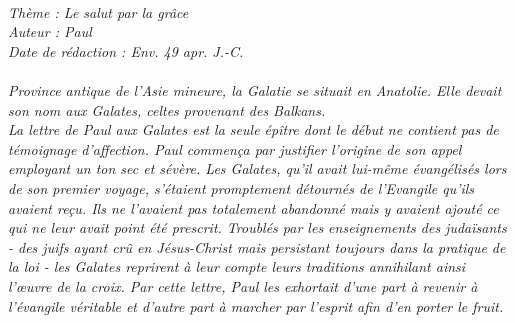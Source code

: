 \BFont
\noindent\hrulefill
\textit{
\bigskip
{\centering{}
\\Thème : Le salut par la grâce
\\Auteur : Paul
\\Date de rédaction : Env. 49 apr. J.-C.\\}
}
\textit{
\\Province antique de l'Asie mineure, la Galatie se situait en Anatolie. Elle devait son nom aux Galates, celtes provenant des Balkans.
\bigskip
\\La lettre de Paul aux Galates est la seule épître dont le début ne contient pas de témoignage d’affection. Paul commença par justifier l’origine de son appel employant un ton sec et sévère. Les Galates, qu’il avait lui-même évangélisés lors de son premier voyage, s’étaient promptement détournés de l’Evangile qu’ils avaient reçu. Ils ne l’avaient pas  totalement abandonné mais y avaient ajouté ce qui ne leur avait point été prescrit. Troublés par les enseignements des judaïsants - des juifs ayant crû en Jésus-Christ mais persistant toujours dans la pratique de la loi - les Galates reprirent à leur compte leurs traditions annihilant ainsi l’œuvre de la croix. Par cette lettre, Paul les exhortait d’une part à revenir à l’évangile véritable et d’autre part à marcher par l’esprit afin d’en porter le fruit.\bigskip
}
\par\nobreak\noindent\hrulefill
